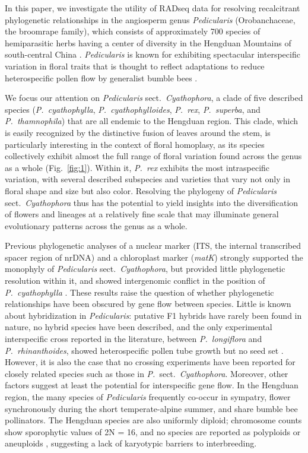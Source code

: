 \documentclass[12pt,letterpaper]{article}
\begin{document}
In this paper, we investigate the utility of RADseq data for resolving
recalcitrant phylogenetic relationships in the angiosperm genus
\emph{Pedicularis} (Orobanchaceae, the broomrape family), which
consists of approximately 700 species of hemiparasitic herbs 
having a center of diversity in the Hengduan Mountains of south-central China
\citep{yang_flora_1998}. \emph{Pedicularis} is known for exhibiting
spectacular interspecific variation in floral traits that is thought
to reflect adaptations to reduce heterospecific pollen flow by
generalist bumble bees
\citep{macior_pollination_1983,grant_modes_1994,eaton_floral_2012}.



We focus our attention on \emph{Pedicularis} sect.\
\emph{Cyathophora}, a clade of five described species
(\emph{P.~cyathophylla}, \emph{P.~cyathophylloides}, \emph{P.~rex},
\emph{P.~superba}, and \emph{P.~thamnophila}) that are all endemic to
the Hengduan region. This clade, which is easily recognized by the
distinctive fusion of leaves around the stem, is particularly
interesting in the context of floral homoplasy, as its species
collectively exhibit almost the full range of floral variation found
across the genus as a whole (Fig.~\ref{fig:1}). Within it,
\emph{P.~rex} exhibits the most intraspecific variation, with several
described subspecies and varieties that vary not only in floral shape
and size but also color. Resolving the phylogeny of \emph{Pedicularis}
sect.\ \emph{Cyathophora} thus has the potential to yield insights
into the diversification of flowers and lineages at a relatively fine
scale that may illuminate general evolutionary patterns across the
genus as a whole.

Previous phylogenetic analyses of a nuclear marker (ITS, the internal
transcribed spacer region of nrDNA) and a chloroplast marker
(\emph{matK}) strongly supported the monophyly of \emph{Pedicularis}
sect.\ \emph{Cyathophora}, but provided little phylogenetic resolution
within it, and showed intergenomic conflict in the position of
\emph{P.~cyathophylla} \citep{ree_phylogeny_2005}. These results raise
the question of whether phylogenetic relationships have been obscured
by gene flow between species. Little is known about hybridization in
\emph{Pedicularis}: putative F1 hybrids have rarely been found in
nature, no hybrid species have been described, and the only
experimental interspecific cross reported in the literature, between
\emph{P.~longiflora} and \emph{P.~rhinanthoides}, showed
heterospecific pollen tube growth but no seed set
\citep{yang_reproductive_2007}. However, it is also the case that no
crossing experiments have been reported for closely related species
such as those in \emph{P.}~sect.\ \emph{Cyathophora}. Moreover, other
factors suggest at least the potential for interspecific gene flow. In
the Hengduan region, the many species of \emph{Pedicularis} frequently
co-occur in sympatry, flower synchronously during the short
temperate-alpine summer, and share bumble bee pollinators. The
Hengduan species are also uniformly diploid; chromosome counts show
sporophytic values of 2N = 16, and no species are reported as
polyploids or aneuploids \citep{goldblatt_index_2010}, suggesting a
lack of karyotypic barriers to interbreeding.
\end{document}
